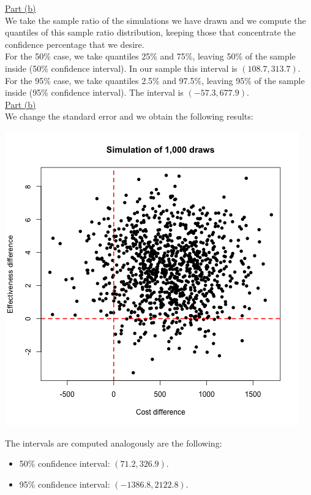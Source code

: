 \documentclass[a4paper, 11pt]{article}
\begin{document}
\underline{Part (b)}\\
\newline We take the sample ratio of the simulations we have drawn and we compute the quantiles of this sample ratio distribution, keeping those that concentrate the confidence percentage that we desire.\\
\newline For the 50\% case, we take quantiles 25\% and 75\%, leaving 50\% of the sample inside (50\% confidence interval). In our sample this interval is $(108.7, 313.7)$.\\
\newline For the 95\% case, we take quantiles 2.5\% and 97.5\%, leaving 95\% of the sample inside (95\% confidence interval). The interval is $(-57.3, 677.9)$.\\
\newline \underline{Part (b)}\\
\newline We change the standard error and we obtain the following results:
\begin{center}
\includegraphics[scale=0.6]{plot_ex3dot3.png}
\end{center}
The intervals are computed analogously are the following:
\begin{itemize}
\item 50\% confidence interval: $(71.2, 326.9)$.
\item 95\% confidence interval: $(-1386.8, 2122.8)$.
\end{itemize}
\end{document}
